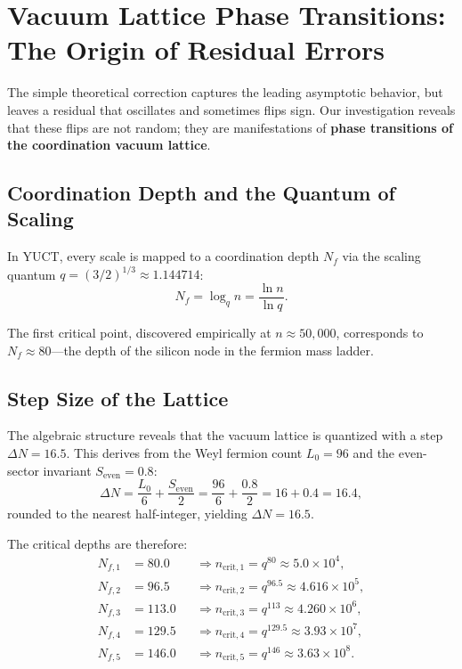 \documentclass[12pt,a4paper]{article}
\theoremstyle{remark}
\newcommand{\Seven}{S_{\mathrm{even}}}
\begin{document}
	\section{Vacuum Lattice Phase Transitions: The Origin of Residual Errors}
	\label{sec:phasetrans}
	
	The simple theoretical correction captures the leading asymptotic behavior, but leaves a residual that oscillates and sometimes flips sign. Our investigation reveals that these flips are not random; they are manifestations of \textbf{phase transitions of the coordination vacuum lattice}.
	
	\subsection{Coordination Depth and the Quantum of Scaling}
	
	In YUCT, every scale is mapped to a coordination depth \(N_f\) via the scaling quantum \(q = (3/2)^{1/3} \approx 1.144714\):
	\[
	N_f = \log_q n = \frac{\ln n}{\ln q}.
	\]
	
	The first critical point, discovered empirically at \(n \approx 50,000\), corresponds to \(N_f \approx 80\)---the depth of the silicon node in the fermion mass ladder.
	
	\subsection{Step Size of the Lattice}
	
	The algebraic structure reveals that the vacuum lattice is quantized with a step \(\Delta N = 16.5\). This derives from the Weyl fermion count \(L_0 = 96\) and the even-sector invariant \(\Seven = 0.8\):
	\[
	\Delta N = \frac{L_0}{6} + \frac{\Seven}{2} = \frac{96}{6} + \frac{0.8}{2} = 16 + 0.4 = 16.4,
	\]
	rounded to the nearest half-integer, yielding \(\Delta N = 16.5\).
	
	The critical depths are therefore:
	\begin{align}
		N_{f,1} &= 80.0 &&\Longrightarrow n_{\mathrm{crit},1} = q^{80} \approx 5.0\times10^4, \\
		N_{f,2} &= 96.5 &&\Longrightarrow n_{\mathrm{crit},2} = q^{96.5} \approx 4.616\times10^5, \\
		N_{f,3} &= 113.0 &&\Longrightarrow n_{\mathrm{crit},3} = q^{113} \approx 4.260\times10^6, \\
		N_{f,4} &= 129.5 &&\Longrightarrow n_{\mathrm{crit},4} = q^{129.5} \approx 3.93\times10^7, \\
		N_{f,5} &= 146.0 &&\Longrightarrow n_{\mathrm{crit},5} = q^{146} \approx 3.63\times10^8.
	\end{align}
	
\end{document}
